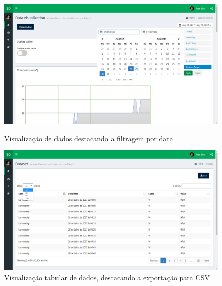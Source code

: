 \begin{figure}[h]
	\centering
	\begin{minipage}[b]{0.495\textwidth}
		\centering
		\includegraphics[width=\textwidth]{prints-web/dataview.png}
		\caption{Visualização de dados destacando a filtragem por data}
		\label{view_grap_data}
	\end{minipage}
	\hfill
	\begin{minipage}[b]{0.495\textwidth}
		\centering
		\includegraphics[width=\textwidth]{prints-web/datatab.png}
		\caption{Visualização tabular de dados, destacando a exportação para \acs{CSV}}
		\label{view_tab_data}
	\end{minipage}
\end{figure}



